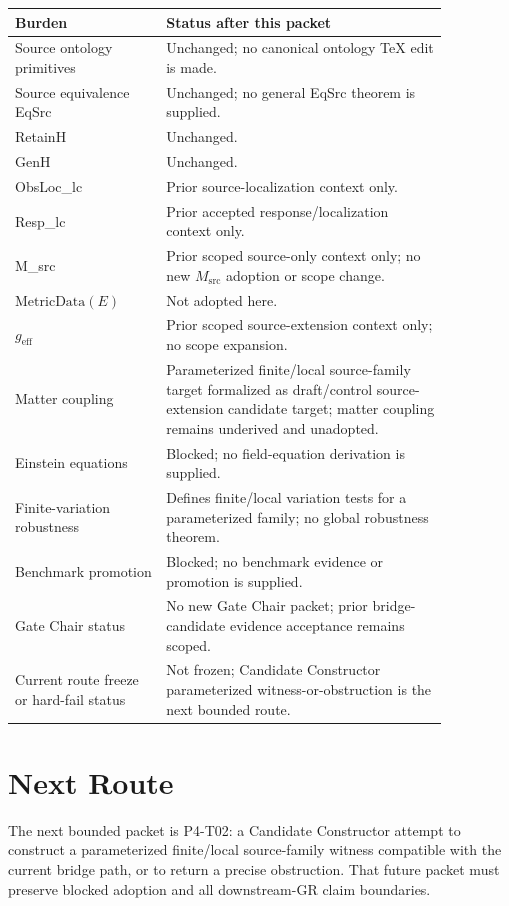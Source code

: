 \documentclass[11pt]{article}
\newcommand{\MetricData}{\mathrm{MetricData}}
\newcommand{\geff}{g_{\mathrm{eff}}}
\newcommand{\Msrc}{M_{\mathrm{src}}}
\begin{document}
\begin{longtable}{p{0.30\linewidth}p{0.56\linewidth}}
\toprule
Burden & Status after this packet \\
\midrule
Source ontology primitives & Unchanged; no canonical ontology TeX edit is made. \\
Source equivalence EqSrc & Unchanged; no general EqSrc theorem is supplied. \\
RetainH & Unchanged. \\
GenH & Unchanged. \\
ObsLoc_lc & Prior source-localization context only. \\
Resp_lc & Prior accepted response/localization context only. \\
M_src & Prior scoped source-only context only; no new \(\Msrc\) adoption or scope change. \\
\(\MetricData(E)\) & Not adopted here. \\
\(\geff\) & Prior scoped source-extension context only; no scope expansion. \\
Matter coupling & Parameterized finite/local source-family target formalized as draft/control source-extension candidate target; matter coupling remains underived and unadopted. \\
Einstein equations & Blocked; no field-equation derivation is supplied. \\
Finite-variation robustness & Defines finite/local variation tests for a parameterized family; no global robustness theorem. \\
Benchmark promotion & Blocked; no benchmark evidence or promotion is supplied. \\
Gate Chair status & No new Gate Chair packet; prior bridge-candidate evidence acceptance remains scoped. \\
Current route freeze or hard-fail status & Not frozen; Candidate Constructor parameterized witness-or-obstruction is the next bounded route. \\
\bottomrule
\end{longtable}

\section{Next Route}

The next bounded packet is P4-T02: a Candidate Constructor attempt to
construct a parameterized finite/local source-family witness compatible with
the current bridge path, or to return a precise obstruction. That future
packet must preserve blocked adoption and all downstream-GR claim boundaries.
\end{document}
